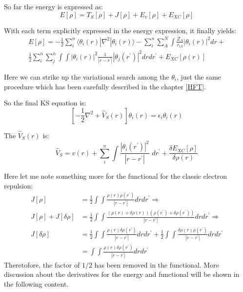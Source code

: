 So far the energy is expressed as:
\begin{equation}\label{}
  E[\rho]=T_{S}[\rho]+J[\rho]+E_{v}[\rho]+E_{XC}[\rho]
\end{equation}

With each term explicitly expressed in the energy expression, it
finally yields:
\begin{multline}\label{}
  E[\rho]=
  -\frac{1}{2}\sum_{i}^{n}\langle\theta_{i}(r)|\nabla^{2}|\theta_{i}(r)\rangle
  -\sum_{i}^{n}\sum_{A}^{N}\int\frac{Z_{A}}{r_{iA}}|\theta_{i}(r)|^{2}dr+ \\
  \frac{1}{2}\sum_{i}^{n}\sum_{j}^{n}
  \int\int|\theta_{i}(r)|^{2}\frac{1}{|r-r^{'}|}|\theta_{j}(r^{'})|^{2}drdr^{'}
  +E_{XC}[\rho(r)]
\end{multline}

Here we can strike up the variational search among the $\theta_{i}$,
just the same procedure which has been carefully described in the
chapter \ref{HFT}.

So the final KS equation is:
\begin{equation}\label{DFTIeq:12}
  \left [ -\frac{1}{2}\nabla^{2} + \hat{V}_{S}(r) \right ] \theta_{i}(r) =
  \epsilon _{i}\theta_{i}(r)
\end{equation}

The $\hat{V}_{S}(r)$ is:
\begin{equation}\label{DFTIeq:13}
  \hat{V}_{S} = v(r) + \sum_{i}^{n}\int\frac{|\theta_{i}(r^{'})|^{2}}
  {|r-r^{'}|}\,\,
  dr^{'}
  + \frac{\delta E_{XC}[\rho]}{\delta \rho(r)}
\end{equation}

Here let me note something more for the functional for the classic
electron repulsion:
\begin{align}\label{}
J[\rho] &=
\frac{1}{2}\int\int\frac{\rho(r)\rho(r^{'})}{|r-r^{'}|}drdr^{'}
\Rightarrow \nonumber \\
J[\rho] + J[\delta\rho] &= \frac{1}{2}\int\int\frac{(\rho(r) +
\delta\rho(r))(\rho(r^{'}) +
\delta\rho(r^{'}))}{|r-r^{'}|}drdr^{'} \Rightarrow \nonumber \\
J[\delta\rho] &= \frac{1}{2}\int\int\frac{\rho(r)
\delta\rho(r^{'})}{|r-r^{'}|}drdr^{'} +
\frac{1}{2}\int\int\frac{\delta\rho(r)\rho(r^{'})}{|r-r^{'}|}drdr^{'}
\nonumber \\
&=\int\int\frac{\rho(r)\delta\rho(r^{'})}{|r-r^{'}|}drdr^{'}
\end{align}
Theretofore, the factor of $1/2$ has been removed in the functional.
More discussion about the derivatives for the energy and functional
will be shown in the following content.



